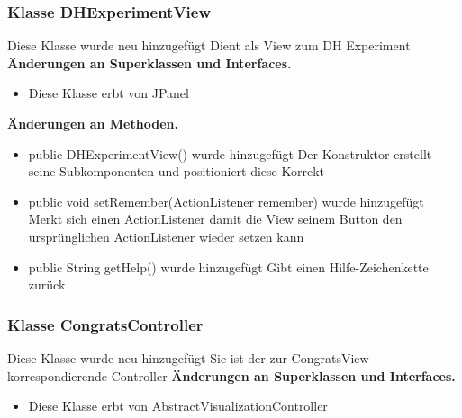 \documentclass{article}
\begin{document}
	\subsubsection{Klasse DHExperimentView}
    Diese Klasse wurde neu hinzugefügt
    Dient als View zum DH Experiment
	    \textbf{Änderungen an Superklassen und Interfaces.}\newline
        \begin{itemize}
            \item Diese Klasse erbt von JPanel\newline
        \end{itemize}
    \textbf{Änderungen an Methoden.}\newline
	   \begin{itemize}
           \item public DHExperimentView() wurde hinzugefügt\newline
               Der Konstruktor erstellt seine Subkomponenten und
               positioniert diese Korrekt
           \item public void setRemember(ActionListener remember) wurde hinzugefügt\newline
               Merkt sich einen ActionListener damit die View seinem Button den ursprünglichen
               ActionListener wieder setzen kann
           \item public String getHelp() wurde hinzugefügt\newline
               Gibt einen Hilfe-Zeichenkette zurück
           \end{itemize}

	\subsubsection{Klasse CongratsController}
    Diese Klasse wurde neu hinzugefügt
    Sie ist der zur CongratsView korrespondierende Controller
	    \textbf{Änderungen an Superklassen und Interfaces.}\newline
        \begin{itemize}
            \item Diese Klasse erbt von AbstractVisualizationController \newline
           \end{itemize}
\end{document}
